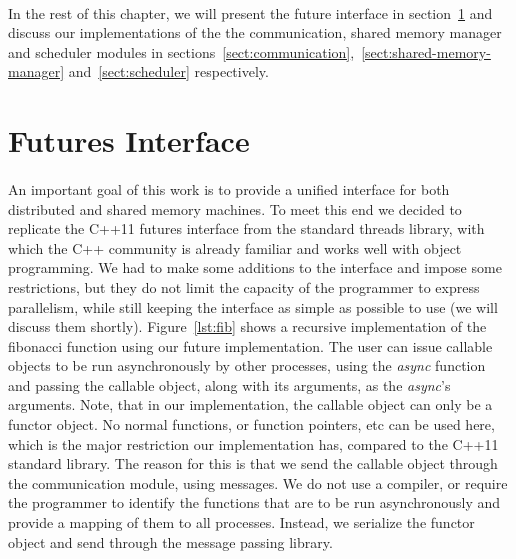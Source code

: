 \paragraph{}
In the rest of this chapter, we will present the future interface in section~\ref{sect:futures-interface}
and discuss our implementations of the the communication, shared memory manager and scheduler modules in
sections~\ref{sect:communication},~\ref{sect:shared-memory-manager} and~\ref{sect:scheduler}
respectively.

\section{Futures Interface}
\label{sect:futures-interface}

\paragraph{}
An important goal of this work is to provide a unified interface for both distributed and shared memory machines.
To meet this end we decided to replicate the C++11 futures interface from the standard threads library, with which
the C++ community is already familiar and works well with object programming.  We had to make some additions to the 
interface and impose some restrictions, but they do not limit the capacity of the programmer to express parallelism,
while still keeping the interface as simple as possible to use (we will discuss them shortly). Figure~\ref{lst:fib} 
shows a recursive implementation of the fibonacci function using our future implementation.  The user can issue 
callable objects to be run asynchronously by other processes, using the \emph{async} function and passing the 
callable object, along with its arguments, as the \emph{async}'s arguments.  Note, that in our implementation, the 
callable object can only be a functor object. No normal functions, or function pointers, etc can be used here, which
is the major restriction our implementation has, compared to the C++11 standard library.  The reason for this is that
we send the callable object through the communication module, using messages.  We do not use a compiler, or require
the programmer to identify the functions that are to be run asynchronously and provide a mapping of them to all 
processes.  Instead, we serialize the functor object and send through the message passing library.  


